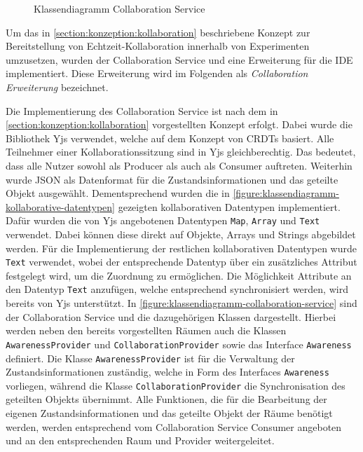 \begin{figure}[tbp]
    \caption{Klassendiagramm Collaboration Service}
    \label{figure:klassendiagramm-collaboration-service}
\end{figure}

Um das in \autoref{section:konzeption:kollaboration} beschriebene Konzept zur Bereitstellung von Echtzeit-Kollaboration innerhalb von Experimenten umzusetzen, wurden der Collaboration Service und eine Erweiterung für die IDE implementiert. Diese Erweiterung wird im Folgenden als \textit{Collaboration Erweiterung} bezeichnet.

Die Implementierung des Collaboration Service ist nach dem in \autoref{section:konzeption:kollaboration} vorgestellten Konzept erfolgt. Dabei wurde die Bibliothek Yjs \cite{noauthor_yjs_nodate} verwendet, welche auf dem Konzept von \acp{CRDT} basiert. Alle Teilnehmer einer Kollaborationssitzung sind in Yjs gleichberechtig. Das bedeutet, dass alle Nutzer sowohl als Producer als auch als Consumer auftreten. Weiterhin wurde JSON als Datenformat für die Zustandsinformationen und das geteilte Objekt ausgewählt. Dementsprechend wurden die in \autoref{figure:klassendiagramm-kollaborative-datentypen} gezeigten kollaborativen Datentypen implementiert. Dafür wurden die von Yjs angebotenen Datentypen \texttt{Map}, \texttt{Array} und \texttt{Text} verwendet. Dabei können diese direkt auf Objekte, Arrays und Strings abgebildet werden. Für die Implementierung der restlichen kollaborativen Datentypen wurde \texttt{Text} verwendet, wobei der entsprechende Datentyp über ein zusätzliches Attribut festgelegt wird, um die Zuordnung zu ermöglichen. Die Möglichkeit Attribute an den Datentyp \texttt{Text} anzufügen, welche entsprechend synchronisiert werden, wird bereits von Yjs unterstützt. In \autoref{figure:klassendiagramm-collaboration-service} sind der Collaboration Service und die dazugehörigen Klassen dargestellt. Hierbei werden neben den bereits vorgestellten Räumen auch die Klassen \texttt{AwarenessProvider} und \texttt{CollaborationProvider} sowie das Interface \texttt{Awareness} definiert. Die Klasse \texttt{AwarenessProvider} ist für die Verwaltung der Zustandsinformationen zuständig, welche in Form des Interfaces \texttt{Awareness} vorliegen, während die Klasse \texttt{CollaborationProvider} die Synchronisation des geteilten Objekts übernimmt. Alle Funktionen, die für die Bearbeitung der eigenen Zustandsinformationen und das geteilte Objekt der Räume benötigt werden, werden entsprechend vom Collaboration Service Consumer angeboten und an den entsprechenden Raum und Provider weitergeleitet.

